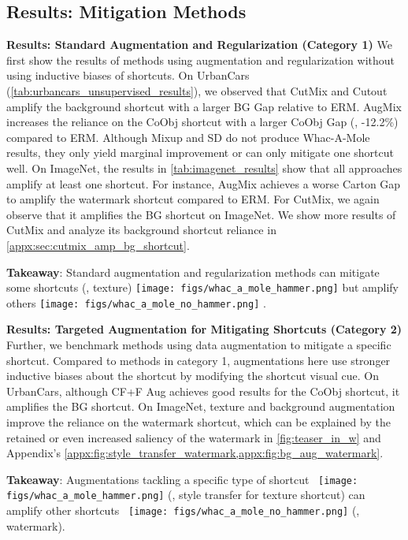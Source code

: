 \documentclass[10pt,twocolumn,letterpaper]{article}
\DeclareRobustCommand{\molehammer}{\begingroup\normalfont
  \texttt{[image: figs/whac\_a\_mole\_hammer.png]}\endgroup
}
\DeclareRobustCommand{\molenohammer}{\begingroup\normalfont
  \texttt{[image: figs/whac\_a\_mole\_no\_hammer.png]}\endgroup
}
\begin{document}
\subsection{Results: Mitigation Methods}
\label{subsec:mitigation_methods_results}

\noindent \textbf{Results: Standard Augmentation and Regularization (Category 1)} \quad We first show the results of methods using augmentation and regularization without using inductive biases of shortcuts.
On UrbanCars (\cref{tab:urbancars_unsupervised_results}), we observed that CutMix and Cutout amplify the background shortcut with a larger BG Gap relative to ERM. AugMix increases the reliance on the CoObj shortcut with a larger CoObj Gap (\ie, -12.2\%) compared to ERM. Although Mixup and SD do not produce Whac-A-Mole results, they only yield marginal improvement or can only mitigate one shortcut well.
On ImageNet, the results in \cref{tab:imagenet_results} show that all approaches amplify at least one shortcut. For instance, AugMix achieves a worse Carton Gap to amplify the watermark shortcut compared to ERM. For CutMix, we again observe that it amplifies the BG shortcut on ImageNet. We show more results of CutMix and analyze its background shortcut reliance in \cref{appx:sec:cutmix_amp_bg_shortcut}.
\begin{mybox}
    \textbf{Takeaway}: Standard augmentation and regularization methods can mitigate some shortcuts (\eg, texture) \molehammer{} but amplify others \molenohammer{}.
\end{mybox}

\noindent \textbf{Results: Targeted Augmentation for Mitigating Shortcuts (Category 2)} \quad Further, we benchmark methods using data augmentation to mitigate a specific shortcut. Compared to methods in category 1, augmentations here use stronger inductive biases about the shortcut by modifying the shortcut visual cue. On UrbanCars, although CF+F Aug achieves good results for the CoObj shortcut, it amplifies the BG shortcut. On ImageNet, texture and background augmentation improve the reliance on the watermark shortcut, which can be explained by the retained or even increased saliency of the watermark in \cref{fig:teaser_in_w} and Appendix's \cref{appx:fig:style_transfer_watermark,appx:fig:bg_aug_watermark}.
\begin{mybox}
    \textbf{Takeaway}: Augmentations tackling a specific type of shortcut~\molehammer{} (\eg, style transfer for texture shortcut) can amplify other shortcuts~\molenohammer{} (\eg, watermark).
\end{mybox}
\end{document}
